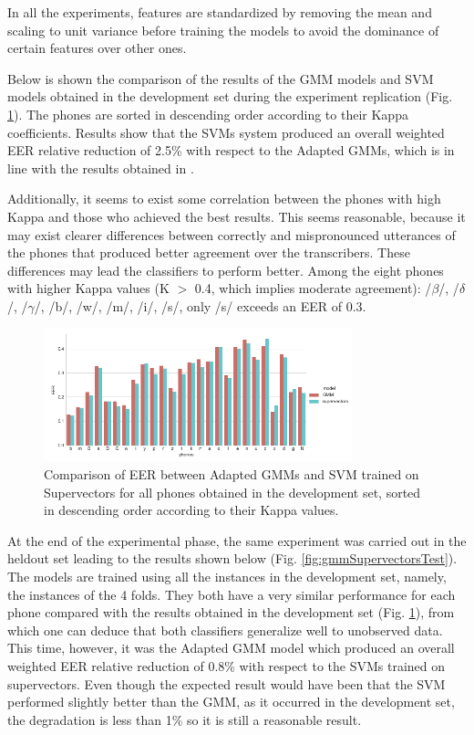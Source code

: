 In all the experiments, features are standardized
by removing the mean and scaling to unit variance
before training the models to avoid the dominance of certain
features over other ones.

Below is shown the
comparison of the results of the GMM models and
SVM models obtained in the development set during the experiment
replication (Fig. \ref{fig:gmmSupervectorsDev}).
The phones are sorted in descending order according to their Kappa coefficients.
Results show that the SVMs system produced an overall weighted EER relative reduction of 2.5\% with
respect to the Adapted GMMs, which is in line with the results obtained
in \cite{main}.

Additionally, it seems to exist some correlation between the phones with high Kappa
and those who achieved
the best results. This seems reasonable, because it may exist clearer differences
between correctly and mispronounced
utterances of the phones that produced better agreement over the transcribers.
These differences may lead the classifiers to perform better.
Among the eight phones with higher Kappa values (K $>$ 0.4, which implies moderate agreement):
/$\beta$/, /$\delta$/, /$\gamma$/, /b/, /w/, /m/, /i/, /s/, only /s/ exceeds an EER of 0.3.

\begin{figure}[H]
	\centering
	\includegraphics[width=0.8\textwidth]{files/figures/results/gmm-vs-supervectors/gmm-vs-supervectors-dev.png}
	\caption{Comparison of EER between Adapted GMMs
	and SVM trained on Supervectors for all phones obtained in the development set, sorted
	in descending order according to their Kappa values.}
	\label{fig:gmmSupervectorsDev}
\end{figure}

At the end of the experimental phase,
the same experiment was carried out in the heldout set
leading to the results shown below
(Fig. \ref{fig:gmmSupervectorsTest}).
The models are trained using all the instances in the development set, namely, the
instances of the 4 folds.
They both have a very similar performance for each phone compared with the results obtained
in the development set (Fig. \ref{fig:gmmSupervectorsDev}),
from which one can deduce that both classifiers generalize well to
unobserved data. This time, however, it was the Adapted GMM model
which produced an overall weighted EER relative reduction of 0.8\% with respect to the SVMs
trained on supervectors. Even though the expected result would have been that the SVM performed
slightly better than the GMM, as it occurred in the development set,
the degradation is less than 1\% so it is still a reasonable result.

